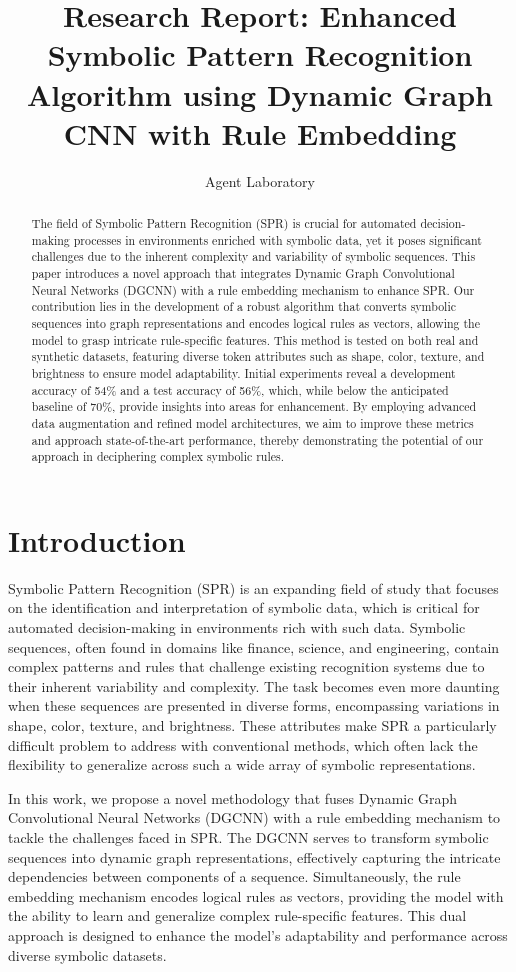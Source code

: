 \documentclass{article}
\title{Research Report: Enhanced Symbolic Pattern Recognition Algorithm using Dynamic Graph CNN with Rule Embedding}
\author{Agent Laboratory}
\begin{document}
\maketitle

\begin{abstract}
The field of Symbolic Pattern Recognition (SPR) is crucial for automated decision-making processes in environments enriched with symbolic data, yet it poses significant challenges due to the inherent complexity and variability of symbolic sequences. This paper introduces a novel approach that integrates Dynamic Graph Convolutional Neural Networks (DGCNN) with a rule embedding mechanism to enhance SPR. Our contribution lies in the development of a robust algorithm that converts symbolic sequences into graph representations and encodes logical rules as vectors, allowing the model to grasp intricate rule-specific features. This method is tested on both real and synthetic datasets, featuring diverse token attributes such as shape, color, texture, and brightness to ensure model adaptability. Initial experiments reveal a development accuracy of 54\% and a test accuracy of 56\%, which, while below the anticipated baseline of 70\%, provide insights into areas for enhancement. By employing advanced data augmentation and refined model architectures, we aim to improve these metrics and approach state-of-the-art performance, thereby demonstrating the potential of our approach in deciphering complex symbolic rules.
\end{abstract}

\section{Introduction}
Symbolic Pattern Recognition (SPR) is an expanding field of study that focuses on the identification and interpretation of symbolic data, which is critical for automated decision-making in environments rich with such data. Symbolic sequences, often found in domains like finance, science, and engineering, contain complex patterns and rules that challenge existing recognition systems due to their inherent variability and complexity. The task becomes even more daunting when these sequences are presented in diverse forms, encompassing variations in shape, color, texture, and brightness. These attributes make SPR a particularly difficult problem to address with conventional methods, which often lack the flexibility to generalize across such a wide array of symbolic representations.

In this work, we propose a novel methodology that fuses Dynamic Graph Convolutional Neural Networks (DGCNN) with a rule embedding mechanism to tackle the challenges faced in SPR. The DGCNN serves to transform symbolic sequences into dynamic graph representations, effectively capturing the intricate dependencies between components of a sequence. Simultaneously, the rule embedding mechanism encodes logical rules as vectors, providing the model with the ability to learn and generalize complex rule-specific features. This dual approach is designed to enhance the model's adaptability and performance across diverse symbolic datasets.
\end{document}
